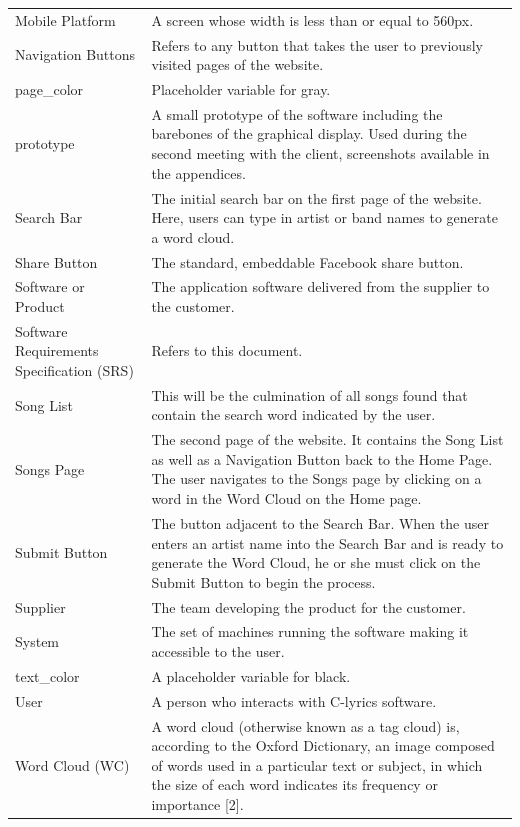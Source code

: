 \documentclass[]{article}
\begin{document}
\begin{tabular}{p{4cm}|p{8cm}}
Mobile Platform & A screen whose width is less than or equal to 560px. \\
Navigation Buttons & Refers to any button that takes the user to previously visited pages of the website. \\
page\_color & Placeholder variable for gray. \\
prototype & A small prototype of the software including the barebones of the graphical display. Used during the second meeting with the client, screenshots available in the appendices. \\
Search Bar & The initial search bar on the first page of the website. Here, users can type in artist or band names to generate a word cloud. \\
Share Button & The standard, embeddable Facebook share button. \\
Software or Product & The application software delivered from the supplier to the customer. \\
Software Requirements Specification (SRS) & Refers to this document. \\
Song List & This will be the culmination of all songs found that contain the search word indicated by the user. \\
Songs Page & The second page of the website. It contains the Song List as well as a Navigation Button back to the Home Page. The user navigates to the Songs page by clicking on a word in the Word Cloud on the Home page. \\
Submit Button & The button adjacent to the Search Bar. When the user enters an artist name into the Search Bar and is ready to generate the Word Cloud, he or she must click on the Submit Button to begin the process. \\
Supplier & The team developing the product for the customer. \\
System & The set of machines running the software making it accessible to the user. \\
text\_color & A placeholder variable for black. \\
User & A person who interacts with C-lyrics software. \\
Word Cloud (WC) & A word cloud (otherwise known as a tag cloud) is, according to the Oxford Dictionary, an image composed of words used in a particular text or subject, in which the size of each word indicates its frequency or importance [2]. \\
\end{tabular}
\end{document}
